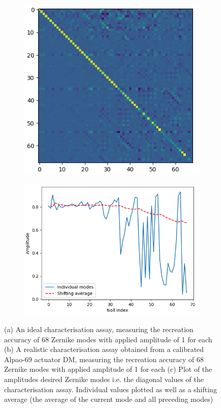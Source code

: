 \begin{figure}[h]
\begin{subfigure}{0.45\textwidth}
		\includegraphics[width=1\linewidth, scale=0.5]{./images/characterisation_assay_real.png}
		\caption{}
		\label{fig:characterisation_assay_real}
	\end{subfigure}
	\begin{subfigure}{0.9\textwidth}
		\centering
		\includegraphics[width=0.5\linewidth, scale=0.5]{./images/characterisation_assay_real_diag_and_avg.png}
		\caption{}
		\label{fig:characterisation_assay_ideal_diag_and_avg}
	\end{subfigure}
	\caption{(a) An ideal characterisation assay, measuring the recreation accuracy of 68 Zernike modes with applied amplitude of 1 for each (b) A realistic characterisation assay obtained from a calibrated Alpao-69 actuator DM, measuring the recreation accuracy of 68 Zernike modes with applied amplitude of 1 for each (c) Plot of the amplitudes desired Zernike modes i.e. the diagonal values of the characterisation assay. Individual values plotted as well as a shifting average (the average of the current mode and all preceding modes)}
	\label{fig:characterisation_assay_results}
\end{figure}

